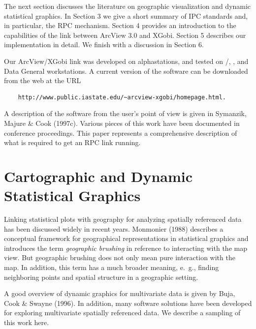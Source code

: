 The next section discusses the literature on geographic visualization
and dynamic statistical graphics.  In Section 3 we give a short
summary of IPC standards and, in particular, the RPC
mechanism. Section 4 provides an introduction to the capabilities of
the link between ArcView 3.0 and XGobi. Section 5 describes our
implementation in detail. We finish with a discussion in Section 6.

Our ArcView/XGobi link was developed on \DECTMfn\/ alphastations, and
tested on \SunTMfn/\SparcTMfn\/, \SGITMfn\/, and Data General
workstations.  A current version of the software can be downloaded from
the web at the URL 
\begin{verbatim}
    http://www.public.iastate.edu/~arcview-xgobi/homepage.html.
\end{verbatim}
A description of the software from the user's point of view is given
in Symanzik, Majure \& Cook (1997c). Various pieces of this work have been
documented in conference proceedings. This paper represents a
comprehensive description of what is required to get an RPC link
running.


\section{Cartographic and Dynamic Statistical Graphics}

Linking statistical plots with geography for
analyzing spatially referenced data has been discussed widely in
recent years. Monmonier (1988) describes a conceptual framework for
geographical representations in statistical graphics and introduces
the term {\it geographic brushing} in reference to interacting with the
map view. But geographic brushing does not only mean pure interaction
with the map. In addition, this term has a much broader meaning,
e.~g., finding neighboring points and spatial structure in a 
geographic setting.

A good overview of dynamic graphics for multivariate data is given by
Buja, Cook \& Swayne (1996).  In addition, many software solutions have
been developed for exploring multivariate spatially referenced data.
We describe a sampling of this work here.

